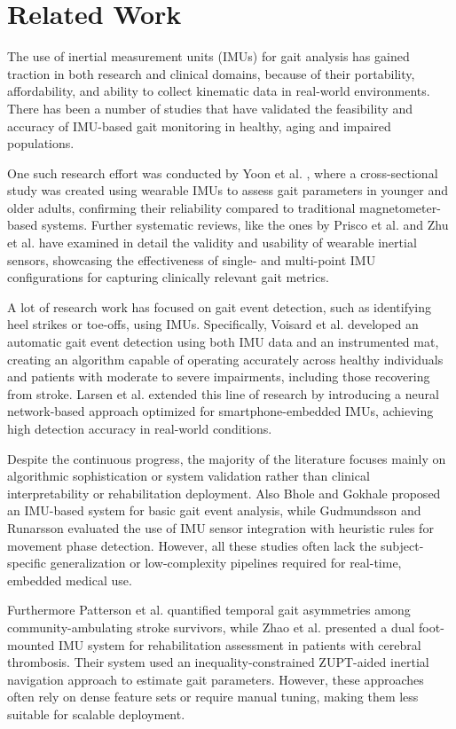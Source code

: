 \section{Related Work}
\label{sec:related_work}
The use of inertial measurement units (IMUs) for gait analysis has gained traction in both research and clinical domains, because of their  portability, 
affordability, and ability to collect kinematic data in real-world environments. There has been a number of studies that have validated the feasibility 
and accuracy of IMU-based gait monitoring in healthy, aging and impaired populations. 

One such research effort was conducted by Yoon et al. \cite{ref20}, where a cross-sectional study was created using wearable IMUs to assess gait 
parameters in younger and older adults, confirming their reliability compared to traditional magnetometer-based systems. Further systematic reviews, 
like the ones by Prisco et al. \cite{ref21} and Zhu et al. \cite{ref22} have examined in detail the validity and usability of wearable 
inertial sensors, showcasing the effectiveness of single- and multi-point IMU configurations for capturing clinically relevant gait metrics.

A lot of research work has focused on gait event detection, such as identifying heel strikes or toe-offs, using IMUs. Specifically, Voisard et al. \cite{ref23}
developed an automatic gait event detection using both IMU data and an instrumented mat, creating an algorithm capable of operating accurately across healthy 
individuals and patients with moderate to severe impairments, including those recovering from stroke. Larsen et al. \cite{ref24} extended this line 
of research by introducing a neural network-based approach optimized for smartphone-embedded IMUs, achieving high detection accuracy in real-world conditions.

Despite the continuous progress, the majority of the literature focuses mainly on algorithmic sophistication or system validation rather than clinical
interpretability or rehabilitation deployment. Also Bhole and Gokhale \cite{ref25} proposed an IMU-based system for basic gait event analysis, 
while Gudmundsson and Runarsson \cite{ref26} evaluated the use of IMU sensor integration with heuristic rules for movement phase detection. However, all these 
studies often lack the subject-specific generalization or low-complexity pipelines required for real-time, embedded medical use.

Furthermore Patterson et al. \cite{ref27} quantified temporal gait asymmetries among community-ambulating stroke survivors, while Zhao et al. 
\cite{ref28} presented a dual foot-mounted IMU system for rehabilitation assessment in patients with cerebral thrombosis. Their system used an 
inequality-constrained ZUPT-aided inertial navigation approach to estimate gait parameters. However, these approaches often rely on dense feature sets 
or require manual tuning, making them less suitable for scalable deployment.

